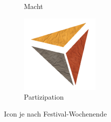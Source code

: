 \begin{figure}
\begin{subfigure}[t]{0.3\columnwidth}
        \caption{Macht}
        \label{fig:macht}
    \end{subfigure}
    \begin{subfigure}[t]{0.3\columnwidth}
        \includegraphics[width=\textwidth]{figures/i_partizipation}
        \caption{Partizipation}
        \label{fig:parti}
    \end{subfigure}
    \caption{Icon je nach Festival-Wochenende}
    \label{fig:icons}
\end{figure}